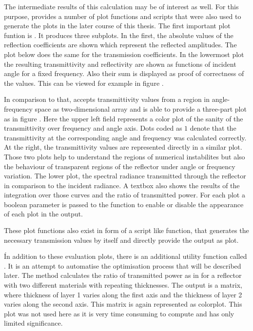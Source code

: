 The intermediate results of this calculation may be of interest as well. For
this purpose,  provides a number of plot functions and
scripts that were also used to generate the plots in the later course of this
thesis. The first important plot funtion is .
It produces three subplots. In the first, the absolute values of the reflection
coefficients are shown which represent the reflected amplitudes. The plot below
does the same for the transmission coefficients. In the lowermost plot the
resulting transmittivity and reflectivity are shown as functions of
incident angle for a fixed frequency. Also their sum is displayed as proof of
correctness of the values. This can be viewed for example in figure
.

In comparison to that,  accepts transmittivity values from
a region in angle-frequency space as two-dimensional array and is able to
provide a three-part plot as in figure . Here the
upper left field represents a color plot of the sanity of the transmittivity
over frequency and angle axis. Dots coded as $1$ denote that the transmittivity
at the corresponding angle and frequency was calculated correctly. At the
right, the transmittivity values are represented directly in a similar plot.
Those two plots help to understand the regions of numerical instabilites but
also the behaviour of transparent regions of the reflector under angle or
frequency variation. The lower plot, the spectral radiance transmitted through
the reflector in comparison to the incident radiance. A textbox also shows the
results of the integration over those curves and the ratio of transmitted
power.
For each plot a boolean parameter is passed to the function to enable or
disable the appearance of each plot in the output.

These plot functions also exist in form of a script like function, that
generates the necessary transmission values by itself and directly provide the
output as plot.

Ín addition to these evaluation plots, there is an additional utility function
called
. It is an attempt to automatise the
optimisation process that will be described later. The method calculates the
ratio of transmitted power as in  for a reflector with
two different materials with repeating thicknesses. The output is a matrix,
where thickness of layer 1 varies along the first axis and the thickness of
layer 2 varies along the second axis. This matrix is again represented as
colorplot. This plot was not used here as it is very time consuming to compute
and has only limited significance.

